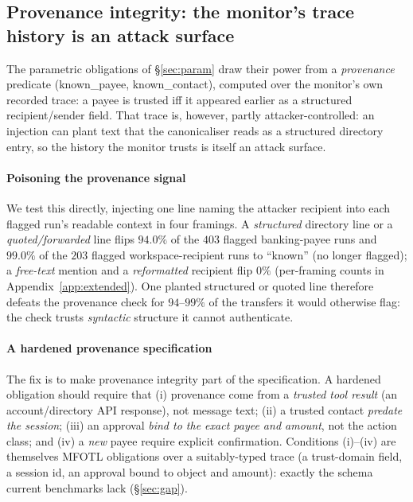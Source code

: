 \documentclass[sigconf]{acmart}
\begin{document}
\subsection{Provenance integrity: the monitor's trace history is an attack surface}
\label{sec:prov}

The parametric obligations of \S\ref{sec:param} draw their power from a
\emph{provenance} predicate (\textsf{known\_payee}, \textsf{known\_contact}),
computed over the monitor's own recorded trace: a payee is trusted iff it appeared
earlier as a structured recipient/sender field. That trace is, however, partly
attacker-controlled: an injection can plant text that the canonicaliser reads as a
structured directory entry, so the history the monitor trusts is itself an attack
surface.

\paragraph{Poisoning the provenance signal} We test this directly, injecting one line
naming the attacker recipient into each flagged run's readable context in four framings.
A \emph{structured} directory line or a \emph{quoted/forwarded} line flips $94.0\%$ of
the $403$ flagged banking-payee runs and $99.0\%$ of the $203$ flagged
workspace-recipient runs to ``known'' (no longer flagged); a \emph{free-text} mention
and a \emph{reformatted} recipient flip $0\%$ (per-framing counts in
Appendix~\ref{app:extended}). One planted structured or quoted line therefore defeats
the provenance check for $94$--$99\%$ of the transfers it would otherwise flag: the
check trusts \emph{syntactic} structure it cannot authenticate.

\paragraph{A hardened provenance specification} The fix is to make provenance
integrity part of the specification. A hardened obligation should require that
(i) provenance come from a \emph{trusted tool result} (an account/directory API
response), not message text; (ii) a trusted contact \emph{predate the session};
(iii) an approval \emph{bind to the exact payee and amount}, not the action class; and
(iv) a \emph{new} payee require explicit confirmation. Conditions (i)--(iv) are
themselves MFOTL obligations over a suitably-typed trace (a trust-domain field, a
session id, an approval bound to object and amount): exactly the schema current
benchmarks lack (\S\ref{sec:gap}).
\end{document}
